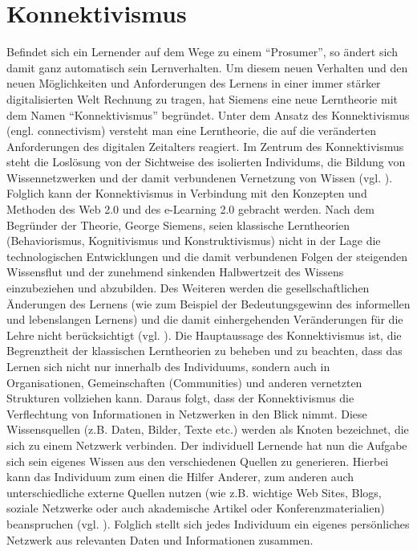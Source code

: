 \section{Konnektivismus}\label{section:konnektivismus}
Befindet sich ein Lernender auf dem Wege zu einem "`Prosumer"', so ändert sich damit ganz automatisch sein Lernverhalten. Um diesem neuen Verhalten und den neuen Möglichkeiten und Anforderungen des Lernens in einer immer stärker digitalisierten Welt Rechnung zu tragen, hat Siemens eine neue Lerntheorie mit dem Namen "`Konnektivismus"' begründet. Unter dem Ansatz des Konnektivismus (engl. connectivism) versteht man eine Lerntheorie, die auf die veränderten Anforderungen des digitalen Zeitalters reagiert. Im Zentrum des Konnektivismus steht die Loslösung von der Sichtweise des isolierten Individums, die Bildung von Wissennetzwerken und der damit verbundenen Vernetzung von Wissen (vgl. \cite{Siemens2004}). Folglich kann der Konnektivismus in Verbindung mit den Konzepten und Methoden des Web 2.0 und des e-Learning 2.0 gebracht werden.
Nach dem Begründer der Theorie, George Siemens, seien klassische Lerntheorien (Behaviorismus, Kognitivismus und Konstruktivismus) nicht in der Lage die technologischen Entwicklungen und die damit verbundenen Folgen der steigenden Wissensflut und der zunehmend sinkenden Halbwertzeit des Wissens einzubeziehen und abzubilden. Des Weiteren werden die gesellschaftlichen Änderungen des Lernens (wie zum Beispiel der Bedeutungsgewinn des informellen und lebenslangen Lernens) und die damit einhergehenden Veränderungen für die Lehre nicht berücksichtigt (vgl. \cite{Siemens2004}).
Die Hauptaussage des Konnektivismus ist, die Begrenztheit der klassischen Lerntheorien zu beheben und zu beachten, dass das Lernen sich nicht nur innerhalb des Individuums, sondern auch in Organisationen, Gemeinschaften (Communities) und anderen vernetzten Strukturen vollziehen kann. Daraus folgt, dass der Konnektivismus die Verflechtung von Informationen in Netzwerken in den Blick nimmt. Diese Wissensquellen (z.B. Daten, Bilder, Texte etc.) werden als Knoten bezeichnet, die sich zu einem Netzwerk verbinden. Der individuell Lernende hat nun die Aufgabe sich sein eigenes Wissen aus den verschiedenen Quellen zu generieren. Hierbei kann das Individuum zum einen die Hilfer Anderer, zum anderen auch unterschiedliche externe Quellen nutzen (wie z.B. wichtige Web Sites, Blogs, soziale Netzwerke oder auch akademische Artikel oder Konferenzmaterialien) beanspruchen (vgl. \cite{Siemens2004}). Folglich stellt sich jedes Individuum ein eigenes persönliches Netzwerk aus relevanten Daten und Informationen zusammen. 

